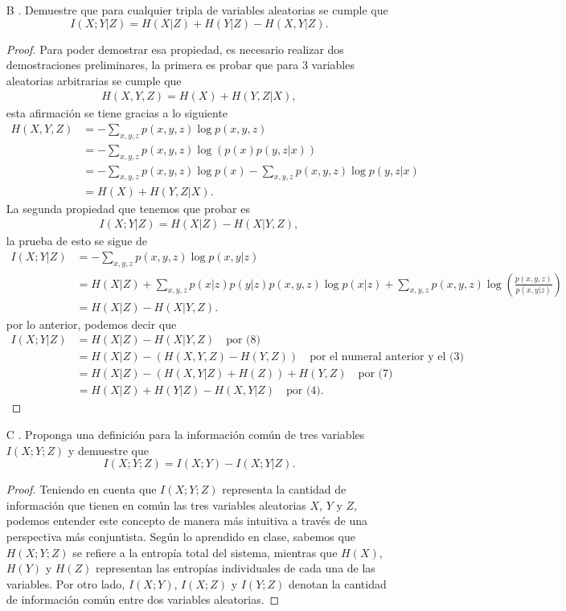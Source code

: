 \begin{enumerate}
    \item[B]. Demuestre que para cualquier tripla de variables aleatorias se cumple que 
    \[
    I(X; Y | Z) = H(X | Z) + H(Y | Z) - H(X, Y | Z).
    \]
    \begin{proof}
    Para poder demostrar esa propiedad, es necesario realizar dos demostraciones preliminares, la primera es probar que para 3 variables aleatorias arbitrarias se cumple que
    \begin{align}
        H(X,Y,Z)=H(X)+H(Y,Z|X)
    ,\end{align}
    esta afirmación se tiene gracias a lo siguiente 
    \begin{align*}
        H(X,Y,Z) &= - \sum_{x,y,z} p(x,y,z) \log p(x,y,z)\\
&= - \sum_{x,y,z} p(x,y,z) \log \left( p(x) p(y,z|x) \right)\\
&= - \sum_{x,y,z} p(x,y,z) \log p(x) - \sum_{x,y,z} p(x,y,z) \log p(y,z|x)\\
&= H(X) + H(Y,Z|X)
    .\end{align*}
La segunda propiedad que tenemos que probar es 
\begin{align}
    I(X;Y |Z) = H(X|Z)-H(X|Y,Z)
,\end{align}
la prueba de esto se sigue de
\begin{align*}
    I(X;Y | Z) &= - \sum_{x,y,z} p(x,y,z) \log p(x,y|z)\\
&= H(X|Z) + \sum_{x,y,z} p(x|z) p(y|z) p(x,y,z) \log p(x|z) + \sum_{x,y,z} p(x,y,z) \log \left( \frac{p(x,y,z)}{p(x,y|z)} \right)\\
&= H(X|Z) - H(X|Y,Z)
.\end{align*}
por lo anterior, podemos decir que 
    \begin{align*}
        I(X;Y | Z) &= H(X | Z) - H(X | Y, Z)\quad \text{por (8)}\\
&= H(X | Z) - \left( H(X, Y, Z) - H(Y, Z) \right) \quad \text{por el numeral anterior y el (3)}\\
&= H(X | Z) - \left( H(X, Y | Z) + H(Z) \right) + H(Y, Z) \quad \text{por (7)}\\
&= H(X | Z) + H(Y | Z) - H(X, Y | Z) \quad \text{por (4)}
    .\end{align*}
\end{proof}

    \item[C]. Proponga una definición para la información común de tres variables $I(X; Y; Z)$ y demuestre que 
    \[
    I(X; Y; Z) = I(X; Y) - I(X; Y | Z).
    \]
    \begin{proof}
    Teniendo en cuenta que $I(X;Y;Z)$ representa la cantidad de información que tienen en común las tres variables aleatorias \( X \), \( Y \) y \( Z \), podemos entender este concepto de manera más intuitiva a través de una perspectiva más conjuntista. Según lo aprendido en clase, sabemos que \( H(X;Y;Z) \) se refiere a la entropía total del sistema, mientras que \( H(X) \), \( H(Y) \) y \( H(Z) \) representan las entropías individuales de cada una de las variables. Por otro lado, \( I(X;Y) \), \( I(X;Z) \) y \( I(Y;Z) \) denotan la cantidad de información común entre dos variables aleatorias.


\end{proof}
\end{enumerate}
